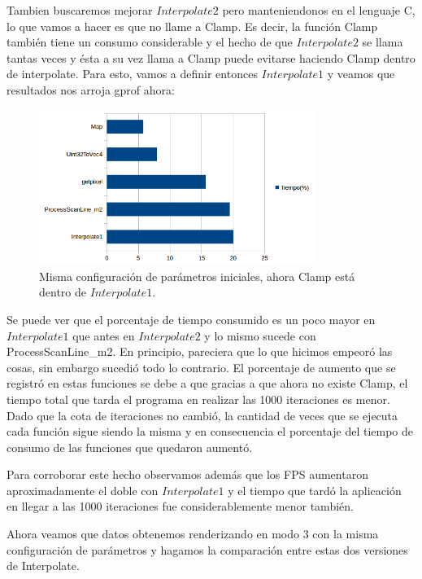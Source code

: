 \documentclass[a4paper]{article}
\begin{document}
Tambien buscaremos mejorar $Interpolate2$ pero manteniendonos en el lenguaje C, lo que vamos a hacer es que no llame a Clamp. Es decir, la función Clamp también tiene un consumo considerable y el hecho de que $Interpolate2$ se llama tantas veces y ésta a su vez llama a Clamp puede evitarse haciendo Clamp dentro de interpolate. Para esto, vamos a definir entonces $Interpolate1$ y veamos que resultados nos arroja gprof ahora:

\begin{figure}[h]
    \centering
    \includegraphics[width=0.8\textwidth]{Imagenes/gprof2.png}
    \caption{Misma configuración de parámetros iniciales, ahora Clamp está dentro de $Interpolate1$.}
    \label{fig:mesh1}
\end{figure}

Se puede ver que el porcentaje de tiempo consumido es un poco mayor en $Interpolate1$ que antes en $Interpolate2$ y lo mismo sucede con ProcessScanLine_m2. En principio, pareciera que lo que hicimos empeoró las cosas, sin embargo sucedió todo lo contrario. El porcentaje de aumento que se registró en estas funciones se debe a que gracias a que ahora no existe Clamp, el tiempo total que tarda el programa en realizar las 1000 iteraciones es menor. Dado que la cota de iteraciones no cambió, la cantidad de veces que se ejecuta cada función sigue siendo la misma y en consecuencia el porcentaje del tiempo de consumo de las funciones que quedaron aumentó.

Para corroborar este hecho observamos además que los FPS aumentaron aproximadamente el doble con $Interpolate1$ y el tiempo que tardó la aplicación en llegar a las 1000 iteraciones fue considerablemente menor también.

Ahora veamos que datos obtenemos renderizando en modo 3 con la misma configuración de parámetros y hagamos la comparación entre estas dos versiones de Interpolate.
\end{document}
